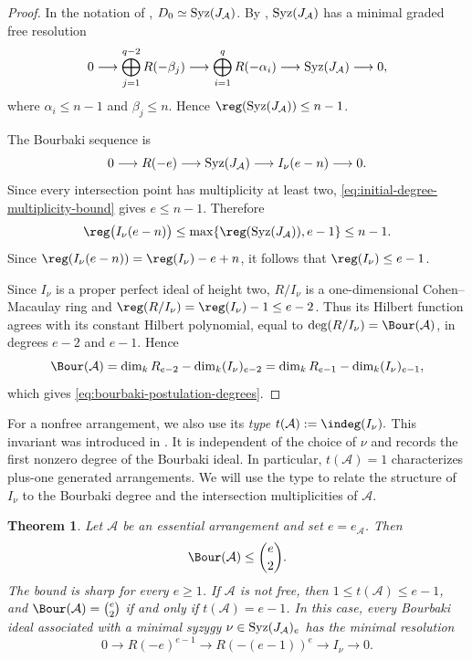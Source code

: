 \documentclass[11pt]{amsart}   %
\newtheorem{Theorem}{Theorem}[section]
\theoremstyle{definition}
\def\syz{\mbox{\rm Syz}}
\def\A{{\mathcal A}}
\begin{document}
\begin{proof}
In the notation of \cite{Schenck}, $D_0\simeq\syz(J_\A)$. By \cite[Corollary~3.5 and the discussion following it]{Schenck}, $\syz(J_\A)$ has a minimal graded free resolution
\[
0\longrightarrow\bigoplus_{j=1}^{q-2}R(-\beta_j)
\longrightarrow\bigoplus_{i=1}^{q}R(-\alpha_i) \longrightarrow\syz(J_\A)\longrightarrow0,
\]
where $\alpha_i\leq n-1$ and $\beta_j\leq n$. Hence $\reg(\syz(J_\A))\leq n-1$.

The Bourbaki sequence is
\[
0\longrightarrow R(-e)\longrightarrow\syz(J_\A)
\longrightarrow I_\nu(e-n)\longrightarrow0.
\]
Since every intersection point has multiplicity at least two, \eqref{eq:initial-degree-multiplicity-bound} gives $e\leq n-1$. Therefore
\[
\reg\bigl(I_\nu(e-n)\bigr)
\leq\max\{\reg(\syz(J_\A)),e-1\}\leq n-1.
\]
Since $\reg(I_\nu(e-n))=\reg(I_\nu)-e+n$, it follows that $\reg(I_\nu)\leq e-1$.

Since $I_\nu$ is a proper perfect ideal of height two, $R/I_\nu$ is a one-dimensional Cohen--Macaulay ring and $\reg(R/I_\nu)=\reg(I_\nu)-1\leq e-2$. Thus its Hilbert function agrees with its constant Hilbert polynomial, equal to $\deg(R/I_\nu)=\Bour(\A)$, in degrees $e-2$ and $e-1$. Hence
\[
\Bour(\A)
=\dim_kR_{e-2}-\dim_k(I_\nu)_{e-2}
=\dim_kR_{e-1}-\dim_k(I_\nu)_{e-1},
\]
which gives \eqref{eq:bourbaki-postulation-degrees}.
\end{proof}

For a nonfree arrangement, we also use its \emph{type} $t(\A):=\indeg(I_\nu).$ This invariant was introduced in \cite[Definition~1.2 and formula~(1.8)]{Abe-Dimca-Pokora-hierarchy}. It is independent of the choice of $\nu$ and records the first nonzero degree of the Bourbaki ideal. In particular, $t(\A)=1$ characterizes plus-one generated arrangements. We will use the type to relate the structure of $I_\nu$ to the Bourbaki degree and the intersection multiplicities of $\A$.

\begin{Theorem}
\label{thm:sharp-triangular-bourbaki-bound}
Let $\A$ be an essential arrangement and set $e=e_\A$. Then
\begin{equation}
\label{eq:sharp-triangular-bourbaki-bound}
\Bour(\A)\leq\binom e2.
\end{equation}
The bound is sharp for every $e\geq1$. If $\A$ is not free, then $1\leq t(\A)\leq e-1$, and $\Bour(\A)=\binom e2$ if and only if $t(\A)=e-1$. In this case, every Bourbaki ideal associated with a minimal syzygy $\nu\in\syz(J_\A)_e$ has the minimal resolution
\begin{equation}
\label{eq:extremal-bourbaki-resolution}
0\longrightarrow R(-e)^{e-1}
\longrightarrow R(-(e-1))^e \longrightarrow I_\nu\longrightarrow0.
\end{equation}
\end{Theorem}
\end{document}
